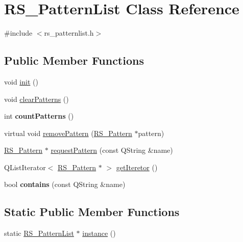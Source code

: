 \hypertarget{classRS__PatternList}{\section{R\-S\-\_\-\-Pattern\-List Class Reference}
\label{classRS__PatternList}
}


{\ttfamily \#include $<$rs\-\_\-patternlist.\-h$>$}

\subsection*{Public Member Functions}
\begin{DoxyCompactItemize}
\item 
void \hyperlink{classRS__PatternList_aa76465362de1503c68e45bfc2b33da14}{init} ()
\item 
void \hyperlink{classRS__PatternList_ae8dd726d35bcccdc6ad9c4240acd4540}{clear\-Patterns} ()
\item 
\hypertarget{classRS__PatternList_a2678dee3bcc95db515da5f8ae684647c}{int {\bfseries count\-Patterns} ()}\label{classRS__PatternList_a2678dee3bcc95db515da5f8ae684647c}

\item 
virtual void \hyperlink{classRS__PatternList_a42b4698692b0885965ab36b85b83a1d2}{remove\-Pattern} (\hyperlink{classRS__Pattern}{R\-S\-\_\-\-Pattern} $\ast$pattern)
\item 
\hyperlink{classRS__Pattern}{R\-S\-\_\-\-Pattern} $\ast$ \hyperlink{classRS__PatternList_aeee4a567b87205b9f678cfdf524e0d2e}{request\-Pattern} (const Q\-String \&name)
\item 
Q\-List\-Iterator$<$ \hyperlink{classRS__Pattern}{R\-S\-\_\-\-Pattern} $\ast$ $>$ \hyperlink{classRS__PatternList_a682a3b9bf8baaea5af75283437a48dae}{get\-Iteretor} ()
\item 
\hypertarget{classRS__PatternList_a3111d8550c198dd069155fb354716d79}{bool {\bfseries contains} (const Q\-String \&name)}\label{classRS__PatternList_a3111d8550c198dd069155fb354716d79}

\end{DoxyCompactItemize}
\subsection*{Static Public Member Functions}
\begin{DoxyCompactItemize}
\item 
static \hyperlink{classRS__PatternList}{R\-S\-\_\-\-Pattern\-List} $\ast$ \hyperlink{classRS__PatternList_a1ddd2ff7072f76366b329db77baa535b}{instance} ()
\end{DoxyCompactItemize}
